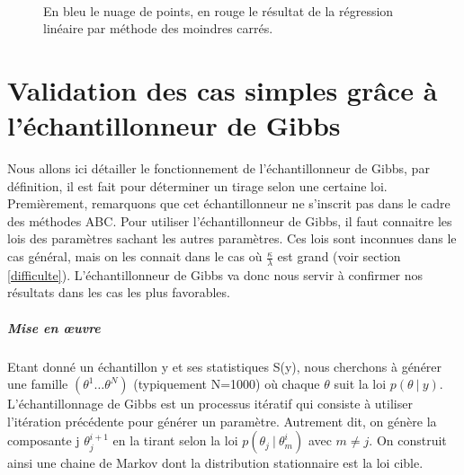 \begin{figure}[!h]
\centering

  \hspace{0.2cm}
   \\
\centering
   \hspace{0.2cm}

\caption{En bleu le nuage de points, en rouge le résultat de la régression linéaire par méthode des moindres carrés.}
\label{nuages}
\end{figure}

\chapter{Validation des cas simples grâce à l'échantillonneur de Gibbs}

Nous allons ici détailler le fonctionnement de l'échantillonneur de Gibbs, par définition, il est fait pour déterminer un tirage selon une certaine loi.\\
Premièrement, remarquons que cet échantillonneur ne s'inscrit pas dans le cadre des méthodes ABC. Pour utiliser l'échantillonneur de Gibbs,  il faut connaitre les lois des paramètres sachant les autres paramètres. Ces lois sont inconnues dans le cas général,  mais on les connait dans le cas où $\frac{\kappa}{\lambda}$ est grand (voir section \ref{difficulte}). L'échantillonneur de Gibbs va donc nous servir à confirmer nos résultats dans les cas les plus favorables.

\paragraph{\Large Mise en œuvre\\}
Etant donné un échantillon y et ses statistiques S(y), nous cherchons à générer une famille $(\theta^1 \dots \theta^N)$ (typiquement N=1000) où chaque $\theta$ suit la loi $p(\theta~|~y)$.\\
L'échantillonnage de Gibbs est un processus itératif qui consiste à utiliser l'itération précédente pour générer un paramètre. Autrement dit, on génère la composante j $\theta^{i+1}_j$ en la tirant selon la loi $p(\theta_j~|~\theta^i_m)$ avec $m \ne j$. On construit ainsi une chaine de Markov dont la distribution stationnaire est la loi cible.

